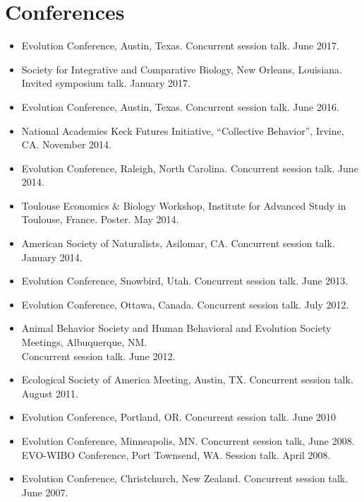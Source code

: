 \documentclass[11pt]{article}
\begin{document}
  \section{Conferences}

  \begin{itemize}
  \item Evolution Conference, Austin, Texas. Concurrent session talk. June 2017.
  \item Society for Integrative and Comparative Biology, New Orleans, Louisiana. Invited symposium talk. January 2017.
  \item Evolution Conference, Austin, Texas. Concurrent session talk. June 2016.
  \item National Academies Keck Futures Initiative, ``Collective Behavior'', Irvine, CA. November 2014.
  \item Evolution Conference, Raleigh, North Carolina. Concurrent session talk. June 2014.
  \item Toulouse Economics \& Biology Workshop, Institute for Advanced Study in Toulouse, France. Poster. May 2014.
  \item American Society of Naturalists, Asilomar, CA. Concurrent session talk. January 2014.
  \item Evolution Conference, Snowbird, Utah. Concurrent session talk. June 2013.
  \item Evolution Conference, Ottawa, Canada. Concurrent session talk. July 2012.
  \item Animal Behavior Society and Human Behavioral and Evolution Society Meetings, Albuquerque, NM.  \\
    Concurrent session talk.  June 2012.
  \item %
    Ecological Society of America Meeting, Austin, TX. Concurrent session talk. August 2011.
  \item %
    Evolution Conference, Portland, OR. Concurrent session talk. June 2010
  \item %
    Evolution Conference, Minneapolis, MN. Concurrent session talk, June 2008. \\
    EVO-WIBO Conference, Port Townsend, WA. Session talk. April 2008. 
  \item %
    Evolution Conference, Christchurch, New Zealand. Concurrent session talk. June 2007. 
  \end{itemize}
\end{document}
